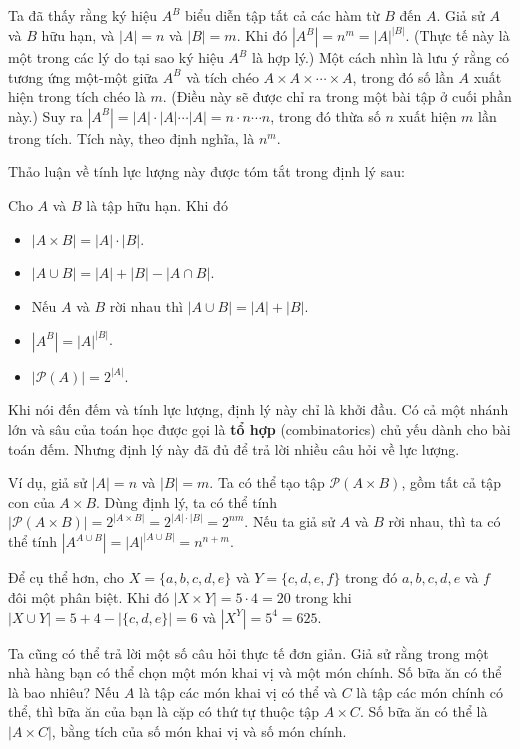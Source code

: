 Ta đã thấy rằng ký hiệu $A^B$ biểu diễn tập tất cả các hàm từ $B$ đến $A$. Giả sử $A$ và $B$ hữu hạn, và $|A| = n$ và $|B| = m$. Khi đó $|A^B| = n^m = |A|^{|B|}$. (Thực tế này là một trong các lý do tại sao ký hiệu $A^B$ là hợp lý.) Một cách nhìn là lưu ý rằng có tương ứng một-một giữa $A^B$ và tích chéo $A \times A \times \cdots \times A$, trong đó số lần $A$ xuất hiện trong tích chéo là $m$. (Điều này sẽ được chỉ ra trong một bài tập ở cuối phần này.) Suy ra $|A^B| = |A| \cdot |A| \cdots |A| = n \cdot n \cdots n$, trong đó thừa số $n$ xuất hiện $m$ lần trong tích. Tích này, theo định nghĩa, là $n^m$.

Thảo luận về tính lực lượng này được tóm tắt trong định lý sau:

\begin{theorem}
Cho $A$ và $B$ là tập hữu hạn. Khi đó
\begin{itemize}
\item $|A \times B| = |A| \cdot |B|$.
\item $|A \cup B| = |A| + |B| - |A \cap B|$.
\item Nếu $A$ và $B$ rời nhau thì $|A \cup B| = |A| + |B|$.
\item $|A^B| = |A|^{|B|}$.
\item $|\mathcal{P}(A)| = 2^{|A|}$.
\end{itemize}
\end{theorem}

Khi nói đến đếm và tính lực lượng, định lý này chỉ là khởi đầu. Có cả một nhánh lớn và sâu của toán học được gọi là \textbf{tổ hợp} (combinatorics) chủ yếu dành cho bài toán đếm. Nhưng định lý này đã đủ để trả lời nhiều câu hỏi về lực lượng.

Ví dụ, giả sử $|A| = n$ và $|B| = m$. Ta có thể tạo tập $\mathcal{P}(A \times B)$, gồm tất cả tập con của $A \times B$. Dùng định lý, ta có thể tính $|\mathcal{P}(A \times B)| = 2^{|A \times B|} = 2^{|A| \cdot |B|} = 2^{nm}$. Nếu ta giả sử $A$ và $B$ rời nhau, thì ta có thể tính $|A^{A \cup B}| = |A|^{|A \cup B|} = n^{n+m}$.

\begin{example}
Để cụ thể hơn, cho $X = \{a,b,c,d,e\}$ và $Y = \{c,d,e,f\}$ trong đó $a, b, c, d, e$ và $f$ đôi một phân biệt. Khi đó $|X \times Y| = 5 \cdot 4 = 20$ trong khi $|X \cup Y| = 5 + 4 - |\{c,d,e\}| = 6$ và $|X^Y| = 5^4 = 625$.
\end{example}

Ta cũng có thể trả lời một số câu hỏi thực tế đơn giản. Giả sử rằng trong một nhà hàng bạn có thể chọn một món khai vị và một món chính. Số bữa ăn có thể là bao nhiêu? Nếu $A$ là tập các món khai vị có thể và $C$ là tập các món chính có thể, thì bữa ăn của bạn là cặp có thứ tự thuộc tập $A \times C$. Số bữa ăn có thể là $|A \times C|$, bằng tích của số món khai vị và số món chính.

